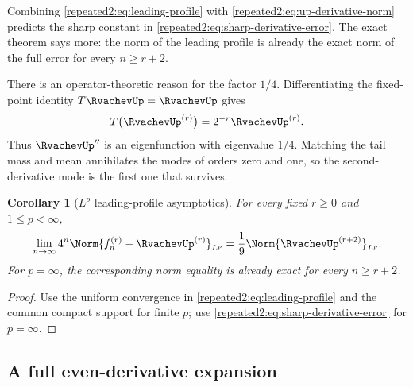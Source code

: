 \documentclass[11pt,oneside]{article}
\newtheorem{corollary}[corollary]{Corollary}
\theoremstyle{definition}
\theoremstyle{remark}
\begin{document}
Combining \eqref{repeated2:eq:leading-profile} with \eqref{repeated2:eq:up-derivative-norm} predicts the sharp
constant in \eqref{repeated2:eq:sharp-derivative-error}.  The exact theorem says more: the norm of the
leading profile is already the exact norm of the full error for every $n\ge r+2$.

There is an operator-theoretic reason for the factor $1/4$.  Differentiating the fixed-point
identity $T\RvachevUp=\RvachevUp$ gives
\begin{equation}
 T\bigl(\RvachevUp^{(r)}\bigr)=2^{-r}\RvachevUp^{(r)}.
 \label{repeated2:eq:T-eigenfunctions}
\end{equation}
Thus $\RvachevUp''$ is an eigenfunction with eigenvalue $1/4$.  Matching the tail mass and mean
annihilates the modes of orders zero and one, so the second-derivative mode is the first one
that survives.

\begin{corollary}[$L^p$ leading-profile asymptotics]
\label{repeated2:cor:Lp}
For every fixed $r\ge0$ and $1\le p<\infty$,
\begin{equation}
 \lim_{n\to\infty}4^n
 \Norm{f_n^{(r)}-\RvachevUp^{(r)}}_{L^p}
 =\frac19\Norm{\RvachevUp^{(r+2)}}_{L^p}.
 \label{repeated2:eq:Lp-asymptotic}
\end{equation}
For $p=\infty$, the corresponding norm equality is already exact for every
$n\ge r+2$.
\end{corollary}

\begin{proof}
Use the uniform convergence in \eqref{repeated2:eq:leading-profile} and the common compact
support for finite $p$; use \eqref{repeated2:eq:sharp-derivative-error} for $p=\infty$.
\end{proof}

\subsection{A full even-derivative expansion}
\end{document}
